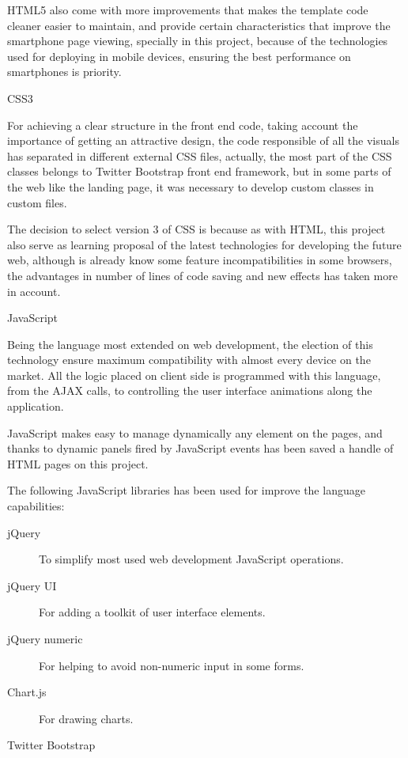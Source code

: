 \documentclass{DeustoFDP}
\begin{document}
HTML5 also come with more improvements that makes the template code cleaner easier to maintain, and provide certain characteristics that improve the smartphone page viewing, specially in this project, because of the technologies used for deploying in mobile devices, ensuring the best performance on smartphones is priority.

{\large CSS3}

For achieving a clear structure in the front end code, taking account the importance of getting an attractive design, the code responsible of all the visuals has separated in different external CSS files, actually, the most part of the CSS classes belongs to Twitter Bootstrap front end framework, but in some parts of the web like the landing page, it was necessary to develop custom classes in custom files.

The decision to select version 3 of CSS is because as with HTML, this project also serve as learning proposal of the latest technologies for developing the future web, although is already know some feature incompatibilities in some browsers, the advantages in number of lines of code saving and new effects has taken more in account.

{\large JavaScript}

Being the language most extended on web development, the election of this technology ensure maximum compatibility with almost every device on the market. All the logic placed on client side is programmed with this language, from the AJAX calls, to controlling the user interface animations along the application.

JavaScript makes easy to manage dynamically any element on the pages, and thanks to dynamic panels fired by JavaScript events has been saved a handle of HTML pages on this project.

The following JavaScript libraries has been used for improve the language capabilities:
\begin{description}
	\item[jQuery] To simplify most used web development JavaScript operations.
	\item[jQuery UI] For adding a toolkit of user interface elements.
	\item[jQuery numeric] For helping to avoid non-numeric input in some forms.
	\item[Chart.js] For drawing charts.
\end{description}

{\large Twitter Bootstrap}
\end{document}
